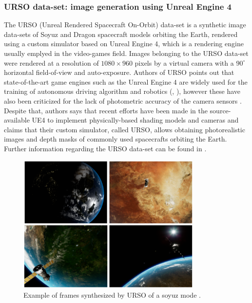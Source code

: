 \subsubsection{URSO data-set: image generation using Unreal Engine 4}
The URSO (Unreal Rendered Spacecraft On-Orbit) data-set is a synthetic image data-sets of Soyuz and Dragon spacecraft models orbiting the Earth, rendered using a custom simulator based on Unreal Engine 4, which is a rendering engine usually emplyed in the video-games field. Images belonging to the URSO data-set were rendered at a resolution of $1080 \times 960$ pixels by a virtual camera with a $90^{\circ}$ horizontal field-of-view and auto-exposure.
Authors of URSO points out that state-of-the-art game engines such as the Unreal Engine 4 are widely used for the training of autonomous driving  algorithm \cite{Dosovitskiy2017CARLAAO} and robotics (\cite{Shah2017AirSimHV}, \cite{MartinezGonzalez2019UnrealROXAE}), however these have also been criticized for the lack of photometric accuracy of the camera sensors \cite{Brochard2018ScientificIR}. Despite that, authors says that recent efforts have been made in the source-available UE4 to implement physically-based shading models and cameras and claims that their custom simulator, called URSO, allows obtaining photorealistic images and depth masks of commonly used spacecrafts orbiting the Earth. Further information regarding the URSO data-set can be found in \cite{Proena2020DeepLF}.

\begin{figure}[htbp]
  \centering
  \includegraphics[width=0.82\textwidth]{gfx/URSO.eps}
  \caption{Example of frames synthesized by URSO of a soyuz mode \cite{Proena2020DeepLF}.}
  \label{fig:URSO}
\end{figure}

